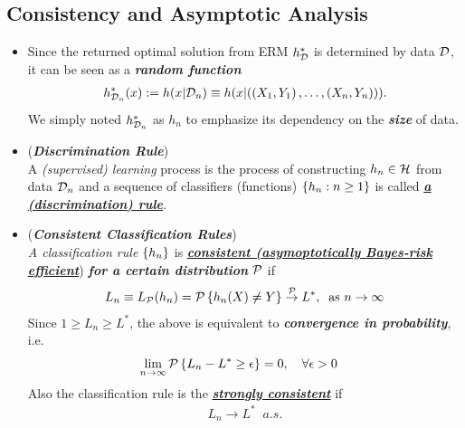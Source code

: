 \documentclass[11pt]{article}
\begin{document}
\subsection{Consistency and Asymptotic Analysis}
\begin{itemize}

\item \begin{remark}
Since the returned optimal solution from ERM $h_{{\mathcal D}}^{*}$ is determined by data ${\mathcal D}$, it can be seen as a \emph{\textbf{random function}}
\begin{align*}
h_{{\mathcal D}_n}^{*}(x) := h(x | {\mathcal D}_n) \equiv  h(x | ((X_1, Y_1) \,{,}\ldots{,}\, (X_n, Y_n)) ).
\end{align*}  We simply noted $h_{{\mathcal D}_n}^{*}$ as $h_n$ to emphasize its dependency on the \emph{\textbf{size}} of data.
\end{remark}

\item  \begin{definition} (\textbf{\emph{Discrimination Rule}}) \citep{devroye2013probabilistic} \\
A \emph{(supervised) learning} process is the process of constructing $h_n \in {\mathcal H}$ from data ${\mathcal D}_n$ and a sequence of classifiers (functions) $\left\{h_{n}: n\ge 1\right\}$ is called \underline{\emph{\textbf{a (discrimination) rule}}}.
\end{definition}

\item 
\begin{definition} (\emph{\textbf{Consistent Classification Rules}})\\
\emph{A classification rule} $\left\{h_n\right\}$ is \underline{\emph{\textbf{consistent (asymoptotically Bayes-risk efficient}}}) \emph{\textbf{for a certain distribution}} ${\mathcal P}$ if 
\begin{align*}
L_n \equiv  L_{{\mathcal P}}(h_n) =  {\mathcal P}\left\{ h_n(X)\neq Y\right\} \stackrel{{\mathcal P}}{\rightarrow} L^{*},\;\; \text{as } n\rightarrow \infty
\end{align*}
Since $1\ge L_{n} \ge  L^{*}$, the above is equivalent to \emph{\textbf{convergence in probability}}, i.e.
\begin{align*}
\lim\limits_{n\rightarrow \infty}{\mathcal P}\left\{ L_{n} - L^{*}\ge \epsilon \right\}&= 0, \quad \forall \epsilon >0
\end{align*}
Also the classification rule is the \underline{\emph{\textbf{strongly consistent}}} if 
\begin{align*}
L_{n} \rightarrow L^{*} \;\; a.s.
\end{align*}
\end{definition}


\end{itemize}
\end{document}
